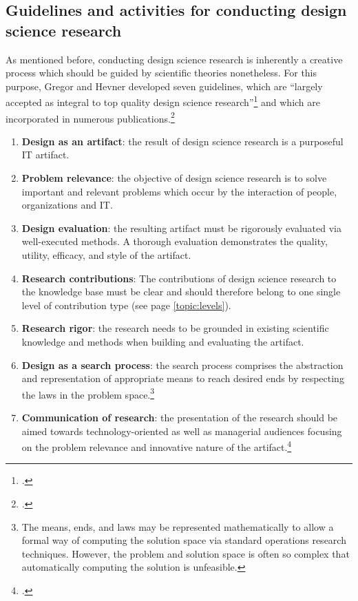 \subsection{Guidelines and activities for conducting design science research} \label{subsec:GuidelinesDesignScience}
As mentioned before, conducting design science research is inherently a creative process which should be guided by scientific theories nonetheless. For this purpose, Gregor and Hevner developed seven guidelines, which are \enquote{largely accepted as integral to top quality design science research}\footcite[p.19]{HevnerDesignResearchInformation2010} and which are incorporated in numerous publications.\footcites[Cf.][p.20 et seqq]{PfeffersDesignScienceResearch2007}
\begin{enumerate}
    \item \textbf{Design as an artifact}: the result of design science research is a purposeful \ac{IT} artifact.
    \item \textbf{Problem relevance}: the objective of design science research is to solve important and relevant problems which occur by the interaction of people, organizations and \ac{IT}.
    \item \textbf{Design evaluation}: the resulting artifact must be rigorously evaluated via well-executed methods. A thorough evaluation demonstrates the quality, utility, efficacy, and style of the artifact.
    \item \textbf{Research contributions}: The contributions of design science research to the knowledge base must be clear and should therefore belong to one single level of contribution type (see page \ref{topic:levels}).
    \item \textbf{Research rigor}: the research needs to be grounded in existing scientific knowledge and methods when building and evaluating the artifact.
    \item \textbf{Design as a search process}: the search process comprises the abstraction and representation of appropriate means to reach desired ends by respecting the laws in the problem space.\footnote{The means, ends, and laws may be represented mathematically to allow a formal way of computing the solution space via standard operations research techniques. However, the problem and solution space is often so complex that automatically computing the solution is unfeasible.}
    \item \textbf{Communication of research}: the presentation of the research should be aimed towards technology-oriented as well as managerial audiences focusing on the problem relevance and innovative nature of the artifact.\footcites[Cf.][p.iv]{ZmudEditorComments1997}[cf.][p.82 et seqq]{HevnerDesignScienceResearch2004}[cf.][p.viii]{WeberEditorCommentsStill2003}
\end{enumerate}

